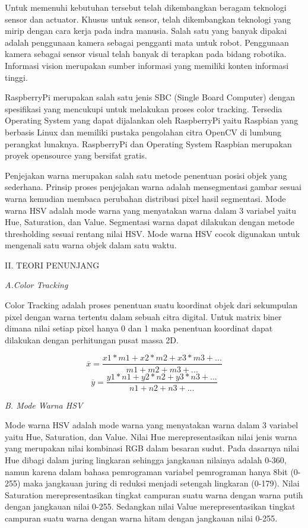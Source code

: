 \documentclass[10pt,journal,compsoc]{IEEEtran}
\begin{document}
  Untuk memenuhi kebutuhan tersebut telah dikembangkan beragam teknologi sensor dan actuator. 
  Khusus untuk sensor, telah dikembangkan teknologi yang mirip dengan cara kerja pada indra manusia. 
  Salah satu yang banyak dipakai adalah penggunaan kamera sebagai pengganti mata untuk robot.
  Penggunaan kamera sebagai sensor visual telah banyak di terapkan pada bidang robotika.
  Informasi vision merupakan sumber informasi yang memiliki konten informasi tinggi.
  
  RaspberryPi merupakan salah satu jenis SBC (Single Board Computer) dengan spesifikasi yang mencukupi untuk melakukan proses color tracking.
  Tersedia Operating System yang dapat dijalankan oleh RaspberryPi yaitu Raspbian yang berbasis Linux dan memiliki pustaka pengolahan citra OpenCV di lumbung perangkat lunaknya. 
  RaspberryPi dan Operating System Raspbian merupakan proyek opensource yang bersifat gratis.
  
  Penjejakan warna merupakan salah satu metode penentuan posisi objek yang sederhana. 
  Prinsip proses penjejakan warna adalah mensegmentasi gambar sesuai warna kemudian membaca perubahan distribusi pixel hasil segmentasi.
  Mode warna HSV adalah mode warna yang menyatakan warna dalam 3 variabel yaitu Hue, Saturation, dan Value.
  Segmentasi warna dapat dilakukan dengan metode thresholding sesuai rentang nilai HSV. 
  Mode warna HSV cocok digunakan untuk mengenali satu warna objek dalam satu waktu.
  
  \begin{center}
     II. TEORI PENUNJANG
  \end{center}
  \noindent \textit{A.Color Tracking}
  
  Color Tracking adalah proses penentuan suatu koordinat objek dari sekumpulan pixel dengan warna tertentu dalam sebuah citra digital.
  Untuk matrix biner dimana nilai setiap pixel hanya 0 dan 1 maka penentuan koordinat dapat dilakukan dengan perhitungan pusat massa 2D.
  
  \begin{equation}
  \overline{x}=\frac{x1*m1 + x2*m2 + x3*m3 +...}{m1 + m2 + m3 +...}
  \end{equation}
  \begin{equation}
  \overline{y}=\frac{y1*n1 + y2*n2 + y3*n3 +...}{n1 + n2 + n3 +...}
  \end{equation}
  
  \noindent \textit{B. Mode Warna HSV}
  
  Mode warna HSV adalah mode warna yang menyatakan warna dalam 3 variabel yaitu Hue, Saturation, dan Value.
  Nilai Hue merepresentasikan nilai jenis warna yang merupakan nilai kombinasi RGB dalam besaran sudut. 
  Pada dasarnya nilai Hue dibagi dalam juring lingkaran sehingga jangkauan nilainya adalah 0-360, namun karena dalam bahasa pemrograman variabel pemrograman hanya 8bit (0-255) maka jangkauan juring di reduksi menjadi setengah lingkaran (0-179).
  Nilai Saturation merepresentasikan tingkat campuran suatu warna dengan warna putih dengan jangkauan nilai 0-255.
  Sedangkan nilai Value merepresentasikan tingkat campuran suatu warna dengan warna hitam dengan jangkauan nilai 0-255.
  
\end{document}
